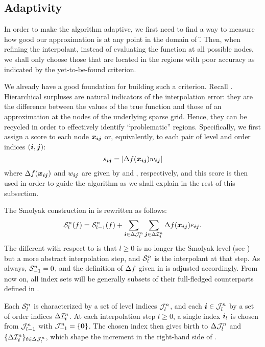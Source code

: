 \subsection{Adaptivity}

In order to make the algorithm adaptive, we first need to find a way to measure
how good our approximation is at any point in the domain of \f. Then, when
refining the interpolant, instead of evaluating the function at all possible
nodes, we shall only choose those that are located in the regions with poor
accuracy as indicated by the yet-to-be-found criterion.

We already have a good foundation for building such a criterion. Recall
. Hierarchical surpluses are natural indicators of the
interpolation error: they are the difference between the values of the true
function and those of an approximation at the nodes of the underlying sparse
grid. Hence, they can be recycled in order to effectively identify
``problematic'' regions. Specifically, we first assign a score to each node
$\boldsymbol{x}_{\boldsymbol{i} \boldsymbol{j}}$ or, equivalently, to each pair of level and order indices $(\boldsymbol{i},
\boldsymbol{j})$:
\[
  s_{\boldsymbol{i} \boldsymbol{j}} = \left| \Delta f(\boldsymbol{x}_{\boldsymbol{i} \boldsymbol{j}}) w_{\boldsymbol{i} \boldsymbol{j}} \right|
\]
where $\Delta f(\boldsymbol{x}_{\boldsymbol{i} \boldsymbol{j}})$ and $w_{\boldsymbol{i}\boldsymbol{j}}$ are given by  and
, respectively, and this score is then used in order to guide the
algorithm as we shall explain in the rest of this subsection.

The Smolyak construction in  is rewritten as follows:
\[
  \mathcal{S}^{n}_{l}(f) = \mathcal{S}^{n}_{l - 1}(f) + \sum_{\boldsymbol{i} \in \Delta\mathcal{J}^{n}_{l}} \sum_{\boldsymbol{j} \in \Delta\mathcal{I}^{n}_{\boldsymbol{i}}} \Delta f(\boldsymbol{x}_{\boldsymbol{i} \boldsymbol{j}}) e_{\boldsymbol{i} \boldsymbol{j}}.
\]
The different with respect to  is that $l \geq 0$ is
no longer the Smolyak level (see ) but a more abstract
interpolation step, and $\mathcal{S}^{n}_{l}$ is the interpolant at that step. As
always, $\mathcal{S}^{n}_{-1} = 0$, and the definition of $\Delta f$ given in
 is adjusted accordingly. From now on, all index sets will be
generally subsets of their full-fledged counterparts defined in .

Each $\mathcal{S}^{n}_{l}$ is characterized by a set of level indices
$\mathcal{J}^{n}_{l}$, and each $\boldsymbol{i} \in \mathcal{J}^{n}_{l}$ by a set of order
indices $\Delta\mathcal{I}^{n}_{\boldsymbol{i}}$. At each interpolation step $l \geq 0$, a
single index $\boldsymbol{i}_l$ is chosen from $\mathcal{J}^{n}_{l - 1}$ with
$\mathcal{J}^{n}_{-1} = \{ \boldsymbol{0} \}$. The chosen index then gives birth to
$\Delta\mathcal{J}^{n}_{l}$ and $\{ \Delta\mathcal{I}^{n}_{\boldsymbol{i}} \}_{\boldsymbol{i} \in
\Delta\mathcal{J}^{n}_{l}}$, which shape the increment in the right-hand side of
.

